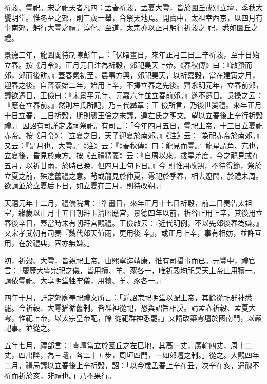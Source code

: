 \begin{pinyinscope}
 祈穀、雩祀。宋之祀天者凡四：孟春祈穀，孟夏大雩，皆於圜丘或別立壇。季秋大饗明堂。惟冬至之郊，則三歲一舉，合祭天地焉。開寶中，太祖幸西京，以四月有事南郊，躬行大雩之禮。淳化、至道，太宗亦以正月躬行祈穀之
 祀，悉如圜丘之禮。



 景德三年，龍圖閣待制陳彭年言：「伏睹畫日，來年正月三日上辛祈穀，至十日始立春。按《月令》，正月元日注為祈穀，郊祀昊天上帝。《春秋傳》曰：『啟蟄而郊，郊而後耕。』蓋春氣初至，農事方興，郊祀昊天，以祈嘉穀，當在建寅之月，迎春之後。自晉泰始二年，始用上辛，不擇立春之先後。齊永明元年，立春前郊，議欲遷日，王儉曰：『宋景平元年、元嘉六年並立春前郊。』遂不遷日。吳操之云：『應在立春前。』然則左氏所記，乃三代彞章；王
 儉所言，乃後世變禮。來年正月十日立春，三日祈穀，斯則襲王儉之末議，違左氏之明文。望以立春後上辛行祈穀禮。」因詔有司詳定諸祠祭祀。有司言：「今年四月五日，雩祀上帝，十三日立夏祀赤帝。按《月令》：『立夏之日，天子迎夏於南郊。』《注》云：『為祀赤帝於南郊。』又云：『是月也，大雩。』《注》云：『《春秋傳》曰：龍見而雩。』龍星謂角、亢也，立夏後，昏見於東方。按《五禮精義》云：『自周以來，歲星差度，今之龍見或在五月，以祈甘雨，於時已晚，但四月上旬卜日。』今
 則惟用改朔，不待得節，祭於立夏之前，殊違舊禮之意。茍或龍見於仲夏，雩祀於季春，相去遼闊，於禮未周。欲請並於立夏后卜日，如立夏在三月，則待改朔。」



 天禧元年十二月，禮儀院言：「準畫日，來年正月十七日祈穀，前二日奏告太祖室，緣歲以正月十五日朝拜玉清昭應宮，景德四年以前，祈谷止用上辛，其後用立春後辛日，蓋當時未有朝拜宮觀禮。王儉啟云：『近代明例，不以先郊後春為嫌。』又宋孝武朝有司奏『魏代郊天值雨，更用後
 辛』，或正月上辛，事有相妨，並許互用，在於禮典，固亦無嫌。」



 初，祈穀、大雩，皆親祀上帝。由熙寧迄靖康，惟有司攝事而已。元豐中，禮官言：「慶歷大雩宗祀之儀，皆用犢、羊、豕各一，唯祈穀均祀昊天上帝止用犢一。請依雩祀、大享明堂牲牢儀，用犢、羊、豕各一。」



 四年十月，詳定郊廟奉祀禮文所言：「近詔宗祀明堂以配上帝，其餘從祀群神悉罷。今祈穀、大雩猶循舊制，皆群神從祀，恐與詔旨相戾。請孟春祈穀、孟夏大雩，惟祀上帝，以太宗皇帝配，餘
 從祀群神悉罷。」又請改築雩壇於國南門，以嚴祀事。並從之。



 五年七月，禮部言：「雩壇當立於圜丘之左巳地，其高一丈，廣輪四丈，周十二丈，四出陛，為三壝，各二十五步，周垣四門，一如郊壇之制。」從之。大觀四年二月，禮局議以立春後上辛祈穀，詔：「以今歲孟春上辛在丑，次辛在亥，遇醜不祈而祈於亥，非禮也。」乃不果行。




\end{pinyinscope}
